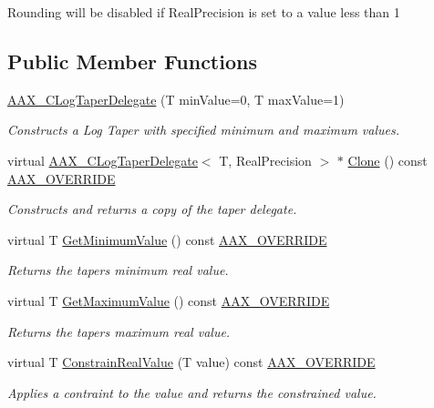 Rounding will be disabled if Real\+Precision is set to a value less than 1 \subsection*{Public Member Functions}
\begin{DoxyCompactItemize}
\item 
\hyperlink{a00023_a757656707e996759b995e7fc0f74d820}{A\+A\+X\+\_\+\+C\+Log\+Taper\+Delegate} (T min\+Value=0, T max\+Value=1)
\begin{DoxyCompactList}\small\item\em Constructs a Log Taper with specified minimum and maximum values. \end{DoxyCompactList}\item 
virtual \hyperlink{a00023}{A\+A\+X\+\_\+\+C\+Log\+Taper\+Delegate}$<$ T, Real\+Precision $>$ $\ast$ \hyperlink{a00023_afac51287c0ecb4490fb75064577d8292}{Clone} () const \hyperlink{a00149_ac2f24a5172689ae684344abdcce55463}{A\+A\+X\+\_\+\+O\+V\+E\+R\+R\+I\+D\+E}
\begin{DoxyCompactList}\small\item\em Constructs and returns a copy of the taper delegate. \end{DoxyCompactList}\item 
virtual T \hyperlink{a00023_a56de6944986d6032132f921af61f52c5}{Get\+Minimum\+Value} () const \hyperlink{a00149_ac2f24a5172689ae684344abdcce55463}{A\+A\+X\+\_\+\+O\+V\+E\+R\+R\+I\+D\+E}
\begin{DoxyCompactList}\small\item\em Returns the taper\textquotesingle{}s minimum real value. \end{DoxyCompactList}\item 
virtual T \hyperlink{a00023_a72a44702c31748303db02c26dd6b9955}{Get\+Maximum\+Value} () const \hyperlink{a00149_ac2f24a5172689ae684344abdcce55463}{A\+A\+X\+\_\+\+O\+V\+E\+R\+R\+I\+D\+E}
\begin{DoxyCompactList}\small\item\em Returns the taper\textquotesingle{}s maximum real value. \end{DoxyCompactList}\item 
virtual T \hyperlink{a00023_ae0c5ef04b9f6e62cff0d73fb9aad7318}{Constrain\+Real\+Value} (T value) const \hyperlink{a00149_ac2f24a5172689ae684344abdcce55463}{A\+A\+X\+\_\+\+O\+V\+E\+R\+R\+I\+D\+E}
\begin{DoxyCompactList}\small\item\em Applies a contraint to the value and returns the constrained value. \end{DoxyCompactList}\item 

\end{DoxyCompactItemize}
